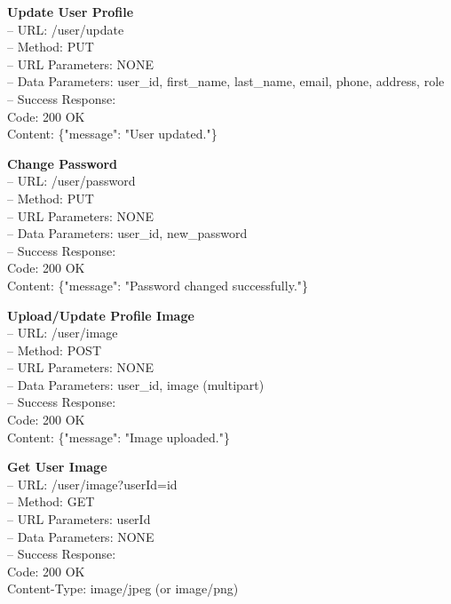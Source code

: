 \begin{flushleft} 
\textbf{Update User Profile} \\
– URL: /user/update \\
– Method: PUT \\
– URL Parameters: NONE \\
– Data Parameters: user\_id, first\_name, last\_name, email, phone, address, role \\
– Success Response: \\
Code: 200 OK \\
Content: \{"message": "User updated."\}
\end{flushleft}

\begin{flushleft} 
\textbf{Change Password} \\
– URL: /user/password \\
– Method: PUT \\
– URL Parameters: NONE \\
– Data Parameters: user\_id, new\_password \\
– Success Response: \\
Code: 200 OK \\
Content: \{"message": "Password changed successfully."\}
\end{flushleft}

\begin{flushleft} 
\textbf{Upload/Update Profile Image} \\
– URL: /user/image \\
– Method: POST \\
– URL Parameters: NONE \\
– Data Parameters: user\_id, image (multipart) \\
– Success Response: \\
Code: 200 OK \\
Content: \{"message": "Image uploaded."\}
\end{flushleft} 

\begin{flushleft} 
\textbf{Get User Image} \\
– URL: /user/image?userId={id} \\
– Method: GET \\
– URL Parameters: userId \\
– Data Parameters: NONE \\
– Success Response: \\
Code: 200 OK \\
Content-Type: image/jpeg (or image/png)
\end{flushleft}